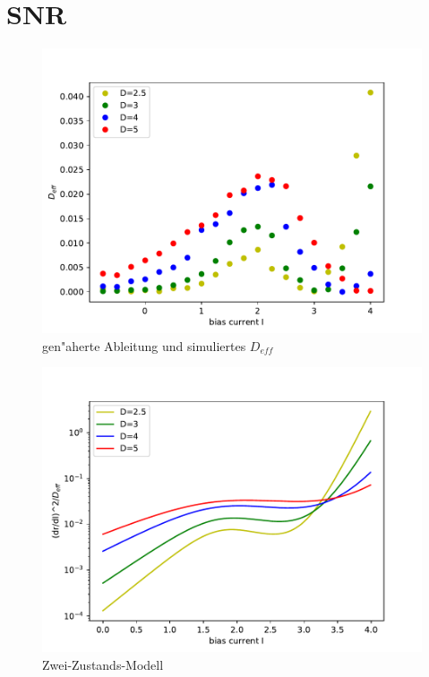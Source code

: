\documentclass[12pt,a4paper]{article}
\begin{document}
\section{SNR}
\begin{figure}[H]
	\centering
	\includegraphics[scale=0.9]{snrcompdf29m.pdf}
	\caption{gen"aherte Ableitung und simuliertes $D_{eff}$}
	\label{snrcomp}
\end{figure}
\begin{figure}[H]
	\centering
	\includegraphics[scale=0.9]{dcompdf29mfull.pdf}
	\caption{Zwei-Zustands-Modell}
	\label{dcompfull}
\end{figure}
\end{document}
